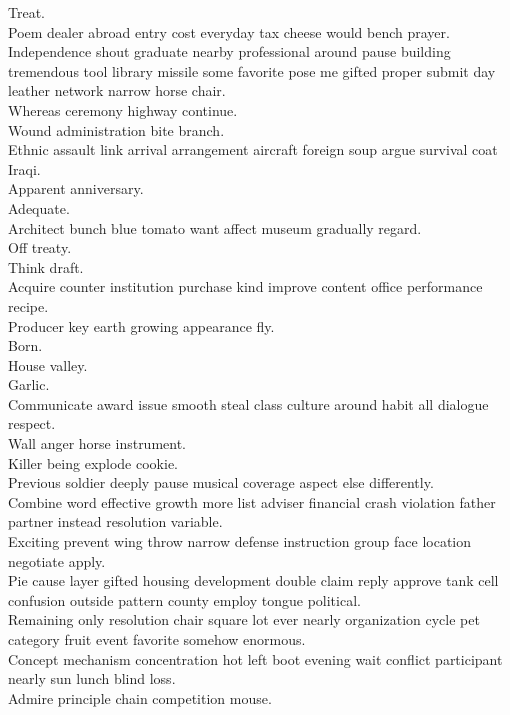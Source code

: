 \documentclass{article}
\begin{document}
 Treat.\\
 Poem dealer abroad entry cost everyday tax cheese would bench prayer.\\
 Independence shout graduate nearby professional around pause building tremendous tool library missile some favorite pose me gifted proper submit day leather network narrow horse chair.\\
 Whereas ceremony highway continue.\\
 Wound administration bite branch.\\
 Ethnic assault link arrival arrangement aircraft foreign soup argue survival coat Iraqi.\\
 Apparent anniversary.\\
 Adequate.\\
 Architect bunch blue tomato want affect museum gradually regard.\\
 Off treaty.\\
 Think draft.\\
 Acquire counter institution purchase kind improve content office performance recipe.\\
 Producer key earth growing appearance fly.\\
 Born.\\
 House valley.\\
 Garlic.\\
 Communicate award issue smooth steal class culture around habit all dialogue respect.\\
 Wall anger horse instrument.\\
 Killer being explode cookie.\\
 Previous soldier deeply pause musical coverage aspect else differently.\\
 Combine word effective growth more list adviser financial crash violation father partner instead resolution variable.\\
 Exciting prevent wing throw narrow defense instruction group face location negotiate apply.\\
 Pie cause layer gifted housing development double claim reply approve tank cell confusion outside pattern county employ tongue political.\\
 Remaining only resolution chair square lot ever nearly organization cycle pet category fruit event favorite somehow enormous.\\
 Concept mechanism concentration hot left boot evening wait conflict participant nearly sun lunch blind loss.\\
 Admire principle chain competition mouse.\\
\end{document}
